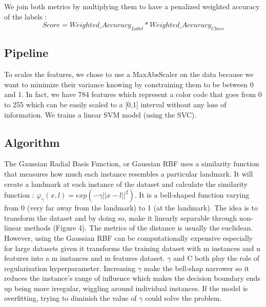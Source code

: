 We join both metrics by multiplying them to have a penalized weighted accuracy of the labels : 
\begin{equation*}
	Score  = Weighted\_Accuracy_{Label} *  Weighted\_Accuracy_{Class}
\end{equation*}



\subsection{Pipeline}
To scales the features, we chose to use a MaxAbsScaler on the data because we want to minimize their variance knowing by constraining them to be between 0 and 1. In fact, we have 784 features which represent a color code that goes from 0 to 255 which can be easily scaled to a [0,1] interval without any loss of information. We trains a linear SVM model (using the SVC). 

\subsection{Algorithm}
The Gaussian Radial Basis Function, or Gaussian RBF uses a similarity function that measures how much each instance resembles a particular landmark. It will create a landmark at each instance of the dataset and calculate the similarity function :  $\varphi_\gamma(x,l)= exp (-\gamma ||x-l||^2)$.
It is a bell-shaped function varying from 0 (very far away from the landmark) to 1 (at the landmark). The idea is to transform the dataset and by doing so, make it linearly separable through non-linear methods (Figure 4).
The metrics of the distance is usually the euclidean.
However, using the Gaussian RBF can be computationally expensive especially for large datasets given it transforms the training dataset with m instances and n features into a m instances and m features dataset.
$\gamma$ and C both play the role of regularization hyperparameter. Increasing $\gamma$ make the bell-shap narrower so it reduces the instance's range of influence which makes the decision boundary ends up being more irregular, wiggling around individual instances.
If the model is overfitting, trying to diminish the value of $\gamma$ could solve the problem.